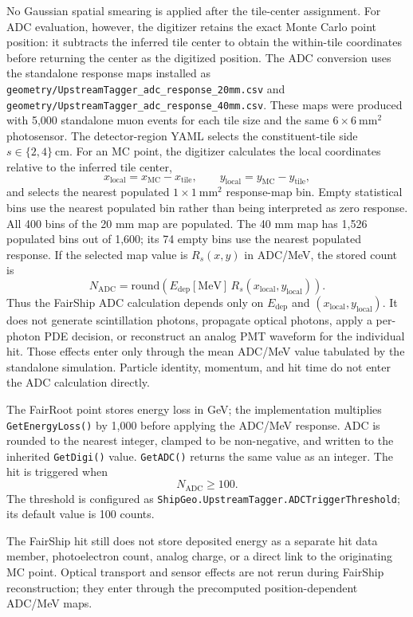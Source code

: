 No Gaussian spatial smearing is applied after the tile-center assignment.  For
ADC evaluation, however, the digitizer retains the exact Monte Carlo point
position: it subtracts the inferred tile center to obtain the within-tile
coordinates before returning the center as the digitized position.  The ADC
conversion uses the standalone response maps installed as
\texttt{geometry/UpstreamTagger\_adc\_response\_20mm.csv} and
\texttt{geometry/UpstreamTagger\_adc\_response\_40mm.csv}.  These maps
were produced with 5,000 standalone muon events for each tile size and the
same $6\times6~\mathrm{mm^2}$ photosensor.  The detector-region YAML selects
the constituent-tile side $s\in\{2,4\}~\mathrm{cm}$.  For an MC point, the
digitizer calculates the local coordinates relative to the inferred tile
center,
\[
  x_\mathrm{local}=x_\mathrm{MC}-x_\mathrm{tile},\qquad
  y_\mathrm{local}=y_\mathrm{MC}-y_\mathrm{tile},
\]
and selects the nearest populated $1\times1~\mathrm{mm^2}$ response-map bin.
Empty statistical bins use the nearest populated bin rather than being
interpreted as zero response.  All 400 bins of the 20 mm map are populated.
The 40 mm map has 1,526 populated bins out of 1,600; its 74 empty bins use the
nearest populated response.  If the selected map value is
$R_s(x,y)$ in ADC/MeV, the stored count is
\[
  N_\mathrm{ADC}=\mathrm{round}\left(
    E_\mathrm{dep}[\mathrm{MeV}]\,
    R_s(x_\mathrm{local},y_\mathrm{local})
  \right).
\]
Thus the FairShip ADC calculation depends only on
$E_\mathrm{dep}$ and $(x_\mathrm{local},y_\mathrm{local})$.  It does not
generate scintillation photons, propagate optical photons, apply a per-photon
PDE decision, or reconstruct an analog PMT waveform for the individual hit.
Those effects enter only through the mean ADC/MeV value tabulated by the
standalone simulation.  Particle identity, momentum, and hit time do not enter
the ADC calculation directly.

\begin{technicaldetails}
The FairRoot point stores energy loss in GeV; the implementation multiplies
\texttt{GetEnergyLoss()} by 1,000 before applying the ADC/MeV response.  ADC is
rounded to the nearest integer, clamped to be non-negative, and written to the
inherited \texttt{GetDigi()} value.  \texttt{GetADC()} returns the same value
as an integer.
The hit is triggered when
\[
  N_\mathrm{ADC} \geq 100.
\]
The threshold is configured as
\texttt{ShipGeo.UpstreamTagger.ADCTriggerThreshold}; its default value is
100 counts.

The FairShip hit still does not store deposited energy as a separate hit data
member, photoelectron count, analog charge, or a
direct link to the originating MC point.  Optical transport and sensor effects
are not rerun during FairShip reconstruction; they enter through the precomputed
position-dependent ADC/MeV maps.
\end{technicaldetails}

